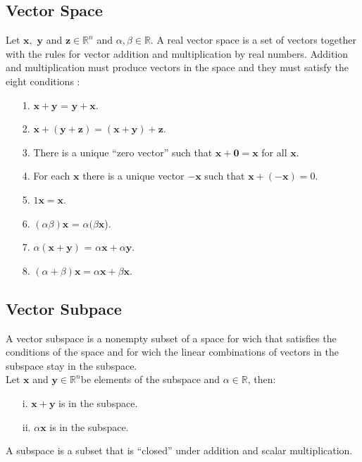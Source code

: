 \documentclass[12pt]{report}
\begin{document}
\subsection*{Vector Space}
Let $\mathbf{x}, $ $\mathbf{y} $ and $\mathbf{z}\in \mathbb{R}^n$ and $\alpha, \beta \in \mathbb{R}$. 
A real vector space is a set of vectors together with the rules for vector addition 
and multiplication by real numbers. 
Addition and multiplication must produce vectors in the space and they must satisfy 
the eight conditions \cite{Strang09}:
\begin{enumerate}
 \item[1.] $\mathbf{x} +\mathbf{y} $ = $ \mathbf{y} +\mathbf{x}$.
\item[2.] $\mathbf{x} +( \mathbf{y} +\mathbf{z})=(\mathbf{x} + \mathbf{y} )+\mathbf{z}.$
\item[3.] There is a unique “zero vector” such that $\mathbf{x} + \mathbf{0} = \mathbf{x}$ for all $\mathbf{x}$.
\item[4.] For each $\mathbf{x}$ there is a unique vector $-\mathbf{x}$ such that $\mathbf{x} + (−\mathbf{x}) = 0$.
\item[5.] $1\mathbf{x}=\mathbf{x}$.
\item[6.] $(\alpha \beta)\mathbf{x}$ = $\alpha(\beta \mathbf{x}$).
\item[7.]$ \alpha(\mathbf{x} +\mathbf{y} )$ = $\alpha\mathbf{x} +\alpha \mathbf{y} $.
\item[8.] $(\alpha +\beta)\mathbf{x}   = \alpha \mathbf{x} +\beta\mathbf{x} .$
\end{enumerate}
\subsection*{Vector Subpace}
A vector subspace is a nonempty subset of a space for wich that satisfies the conditions of the space and for wich the linear combinations of vectors in the subspace stay in the subspace. \\
Let $\mathbf{x} $  and $\mathbf{y}\in \mathbb{R}^n$be elements of the subspace and $\alpha \in \mathbb{R}$, then:
\begin{enumerate}
 \item[i.] $\mathbf{x} +\mathbf{y} $ is in the subspace.
\item[ii.] $\alpha \mathbf{x}$ is in the subspace.
\end{enumerate}
 A subspace is a subset that is “closed” under addition and scalar multiplication. 
\end{document}
